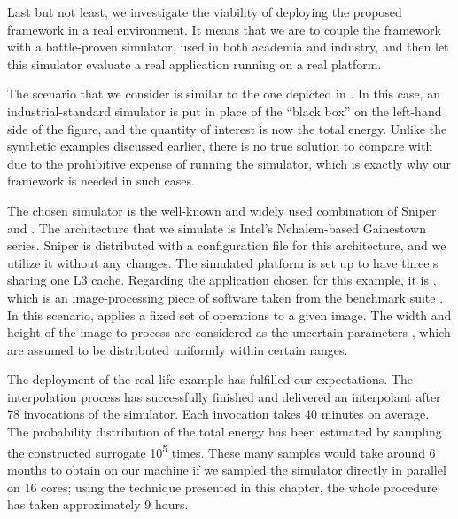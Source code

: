 Last but not least, we investigate the viability of deploying the proposed
framework in a real environment. It means that we are to couple the framework
with a battle-proven simulator, used in both academia and industry, and then let
this simulator evaluate a real application running on a real platform.

The scenario that we consider is similar to the one depicted in
. In this case, an industrial-standard simulator is put
in place of the ``black box'' on the left-hand side of the figure, and the
quantity of interest \g is now the total energy. Unlike the synthetic examples
discussed earlier, there is no true solution to compare with due to the
prohibitive expense of running the simulator, which is exactly why our framework
is needed in such cases.

The chosen simulator is the well-known and widely used combination of Sniper
\cite{carlson2011} and  \cite{li2009}. The architecture that we
simulate is Intel's Nehalem-based Gainestown series. Sniper is distributed with
a configuration file for this architecture, and we utilize it without any
changes. The simulated platform is set up to have three s sharing one L3
cache. Regarding the application chosen for this example, it is , which
is an image-processing piece of software taken from the  benchmark
suite \cite{bienia2011}. In this scenario,  applies a fixed set of
operations to a given image. The width and height of the image to process are
considered as the uncertain parameters \vu, which are assumed to be distributed
uniformly within certain ranges.

The deployment of the real-life example has fulfilled our expectations. The
interpolation process has successfully finished and delivered an interpolant
after 78 invocations of the simulator. Each invocation takes 40 minutes on
average. The probability distribution of the total energy has been estimated by
sampling the constructed surrogate 10\textsuperscript{5} times. These many
samples would take around 6 months to obtain on our machine if we sampled the
simulator directly in parallel on 16 cores; using the technique presented in
this chapter, the whole procedure has taken approximately 9 hours.
